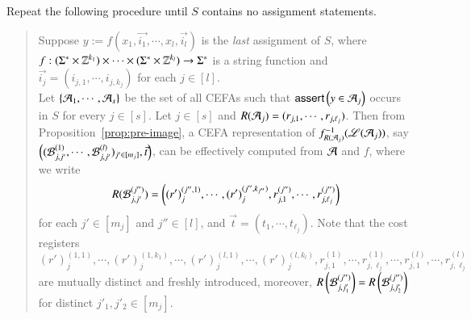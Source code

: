 Repeat the following procedure until $S$ contains no assignment statements.
%
\begin{quote}
Suppose $y := f(x_1, \vec{i_1}, \cdots, x_l, \vec{i_l})$ is the \emph{last} assignment of $S$, where $f: (\Sigma^* \times \mathbb{Z}^{k_1}) \times \cdots \times (\Sigma^* \times \mathbb{Z}^{k_l}) \rightarrow \Sigma^*$ is a string function and $\vec{i_j}= (i_{j,1}, \cdots, i_{j, k_j})$ for each $j \in [l]$.
\\
Let $\{\mathcal{A}_1, \cdots, \mathcal{A}_s\}$ be the set of all CEFAs such that $\textsf{assert}\left(y \in \mathcal{A}_j\right)$ occurs in $S$ for every $j \in [s]$. 
Let $j \in [s]$ and $R(\mathcal{A}_j)=(r_{j,1}, \cdots, r_{j, \ell_j})$. Then from Proposition~\ref{prop:pre-image}, 
a CEFA representation of $f^{-1}_{R(\mathcal{A}_j)}(\mathscr{L}(\mathcal{A}_j))$, say $\left((\mathcal{B}^{(1)}_{j, j'}, \cdots, \mathcal{B}^{(l)}_{j, j'})_{j' \in [m_j]}, \vec{t}\right)$, can be effectively computed from $\mathcal{A}$ and $f$, where we write
\[
R(\mathcal{B}^{(j'')}_{j, j'})=\left((r')^{(j'',1)}_{j}, \cdots, (r')_{j}^{(j'',k_{j''})}, r^{(j'')}_{j, 1}, \cdots,r^{(j'')}_{j, \ell_j} \right)
\]
for each $j' \in [m_j]$ and $j'' \in [l]$, and $\vec{t}=(t_1,\cdots, t_{\ell_j})$. Note that the cost registers $(r')^{(1,1)}_{j}, \cdots, (r')_{j}^{(1,k_1)}, \cdots, (r')^{(l,1)}_{j}, \cdots, (r')_{j}^{(l,k_l)}, r^{(1)}_{j, 1}, \cdots,r^{(1)}_{j, \ell_j}, \cdots, r^{(l)}_{j, 1}, \cdots,r^{(l)}_{j, \ell_j}$ are mutually distinct and freshly introduced, moreover, $R\left(\mathcal{B}^{(j'')}_{j, j'_1}\right)=R\left(\mathcal{B}^{(j'')}_{j, j'_2}\right)$ for distinct $j'_1,j'_2 \in [m_j]$.
%


\end{quote}
